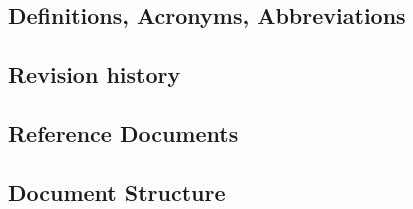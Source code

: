 \subsection{Definitions, Acronyms, Abbreviations}
\subsection{Revision history}
\subsection{Reference Documents }
\subsection{Document Structure}


